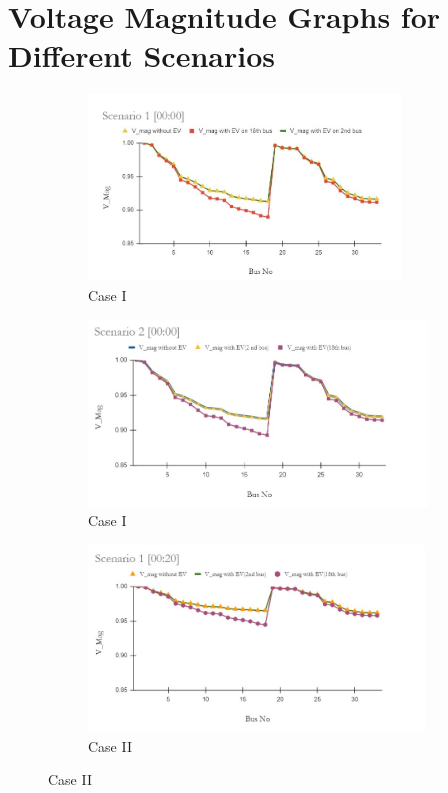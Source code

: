 	
	\section{Voltage Magnitude Graphs for Different Scenarios}
	
	 \begin{figure}[!h]
		\begin{subfigure}{.5\textwidth}
			\centering
			\includegraphics[width=.97\linewidth,height= 4.95cm]{./Figures/sc 1 (00_00)}  
			\caption{Case I}
			\label{fig:LFa}
		\end{subfigure}
		\begin{subfigure}{.5\textwidth}
			\centering
			\includegraphics[width=.97\linewidth,height= 4.95cm]{./Figures/sc 2 (00_00)}  
			\caption{Case I}
			\label{fig:LF2a}
		\end{subfigure}
		\begin{subfigure}{.5\textwidth}
			\centering
			\includegraphics[width=.97\linewidth,height= 4.95cm]{./Figures/sc 1 (00_20)}
			\caption{Case II}
			\label{fig:LFb}
		\end{subfigure}

\end{figure}
